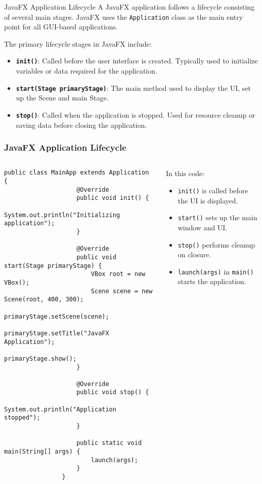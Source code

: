 \documentclass[aspectratio=169, table]{beamer}
\begin{document}
\begin{frame}[fragile]{JavaFX Application Lifecycle}
	\vspace{20pt}
	A JavaFX application follows a lifecycle consisting of several main stages.  
	JavaFX uses the \texttt{Application} class as the main entry point for all GUI-based applications.
	
	\bigskip
	The primary lifecycle stages in JavaFX include:
	\begin{itemize}
		\item \textbf{\texttt{init()}}: Called before the user interface is created.  
		Typically used to initialize variables or data required for the application.
		\item \textbf{\texttt{start(Stage primaryStage)}}: The main method used to display the UI,  
		set up the Scene and main Stage.
		\item \textbf{\texttt{stop()}}: Called when the application is stopped.  
		Used for resource cleanup or saving data before closing the application.
	\end{itemize}
\end{frame}


\begin{frame}[fragile]
	\frametitle{JavaFX Application Lifecycle}
	\begin{columns}[t]
		\begin{column}{0.55\textwidth}
			\vspace{20pt}
			\begin{lstlisting}[style=JavaStyle]
				public class MainApp extends Application {
					@Override
					public void init() {
						System.out.println("Initializing application");
					}
					
					@Override
					public void start(Stage primaryStage) {
						VBox root = new VBox();
						Scene scene = new Scene(root, 400, 300);
						primaryStage.setScene(scene);
						primaryStage.setTitle("JavaFX Application");
						primaryStage.show();
					}
					
					@Override
					public void stop() {
						System.out.println("Application stopped");
					}
					
					public static void main(String[] args) {
						launch(args);
					}
				}
			\end{lstlisting}
		\end{column}
		\begin{column}{0.45\textwidth}
			In this code:
			\begin{itemize}
				\item \texttt{init()} is called before the UI is displayed.
				\item \texttt{start()} sets up the main window and UI.
				\item \texttt{stop()} performs cleanup on closure.
				\item \texttt{launch(args)} in \texttt{main()} starts the application.
			\end{itemize}
		\end{column}
	\end{columns}
\end{frame}
\end{document}
